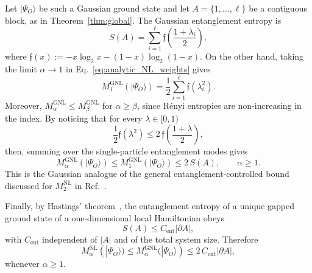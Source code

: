 \documentclass[prx,twocolumn,superscriptaddress,aps,10pt, frontmatterverbose, reprint,footinbib,longbibliography=true]{revtex4-2}
\newcommand{\RENYI}{\alpha}
\providecommand{\DIFaddtex}[1]{{\protect\color{red}#1}} %
\providecommand{\DIFaddbegin}{\protect\color{red}} %
\providecommand{\DIFaddend}{\protect\color{black}} %
\providecommand{\DIFaddtex}[1]{\texorpdfstring{\DIFaddtex{#1}}{#1}} %
\providecommand{\DIFadd}[1]{\texorpdfstring{\DIFaddtex{#1}}{#1}} %
\newcommand{\DIFaddincludegraphics}[2][]{{\color{blue}\fbox{\DIFOincludegraphics[#1]{#2}}}} %
\DeclareRobustCommand{\DIFaddbegin}{\DIFOaddbegin \let\includegraphics\DIFaddincludegraphics} %
\DeclareRobustCommand{\DIFaddend}{\DIFOaddend \let\includegraphics\DIFOincludegraphics} %
\begin{document}
Let $|\Psi_O\rangle$ be such a Gaussian ground state and let \DIFaddbegin \DIFadd{$A=\{1,\dots,\ell\}$ }\DIFaddend be a contiguous \DIFaddbegin \DIFadd{block, as in Theorem~\ref{thm:global}}\DIFaddend . The Gaussian entanglement entropy is
\begin{equation}
    S(A)=
    \sum_{i=1}^{\ell}
    \mathfrak{f}\!\left(\frac{1+\lambda_i}{2}\right),
    \label{eq:gaussian_entropy_area_law_sec}
\end{equation}
where $\mathfrak{f}(x):=-x\log_2x-(1-x)\log_2(1-x)$. On the other hand, taking the limit \(\RENYI\to1\) in Eq.~\eqref{eq:analytic_NL_weights} gives
\begin{equation}
    M_{1}^{\mathrm{GNL}}(|\Psi_O\rangle)
    =
    \frac{1}{2}
    \sum_{i=1}^{\ell}
    \mathfrak{f}(\lambda_i^2).
    \label{eq:M1_GNL}
\end{equation}
Moreover, $M_{\alpha}^{\mathrm{GNL}}\le M_{\beta}^{\mathrm{GNL}}$ for $\alpha\ge\beta$, since R\'enyi entropies are non-increasing in the index. By noticing that for every $\lambda\in[0,1)$
\begin{equation}
    \frac{1}{2}\mathfrak{f}(\lambda^2)
    \le
    2\, \mathfrak{f}\!\left(\frac{1+\lambda}{2}\right),
    \label{eq:m1_entropy_bound}
\end{equation}
then, summing over the single-particle entanglement modes gives
\begin{equation}
    M_{\RENYI}^{\mathrm{GNL}}(|\Psi_O\rangle)
    \le
    M_{1}^{\mathrm{GNL}}(|\Psi_O\rangle)
    \le
    2\, S(A),
    \qquad
    \RENYI\ge1.
    \label{eq:GNL_bound_by_entropy_all_alpha}
\end{equation}
This is the Gaussian analogue of the general entanglement-controlled bound discussed for $M_2^{\mathrm{NL}}$ in Ref.~\cite{Cao_2025}.

Finally, by Hastings' theorem~\cite{Hastings_2007}, the entanglement entropy of a unique gapped ground state of a one-dimensional local Hamiltonian obeys
\begin{equation}
    S(A)\le C_{\mathrm{ent}}|\partial A|,
    \label{eq:Hastings_area_law}
\end{equation}
with $C_{\mathrm{ent}}$ independent of $|A|$ and of the total system size. Therefore
\begin{equation}
    M_{\RENYI}^{\mathrm{NL}}(|\Psi_O\rangle)
    \le
    M_{\RENYI}^{\mathrm{GNL}}(|\Psi_O\rangle)
    \le
    2\, C_{\mathrm{ent}}|\partial A|,
    \label{eq:GNL_area_law_final}
\end{equation}
whenever $\RENYI\ge1$. 
\end{document}
